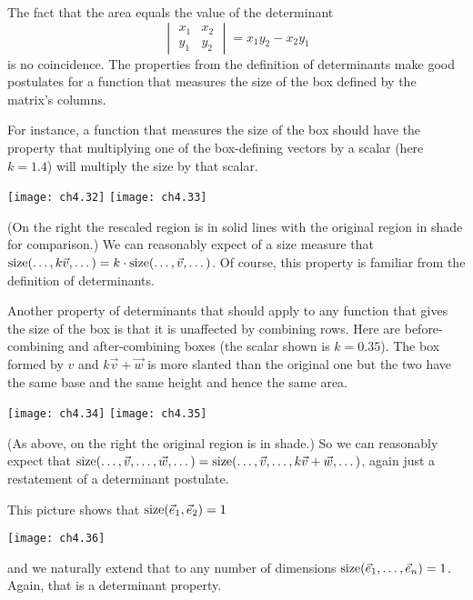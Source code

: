 The fact that the area equals the value of the determinant
\begin{equation*}
  \begin{vmatrix}
    x_1  &x_2  \\
    y_1  &y_2
  \end{vmatrix}
  =x_1y_2-x_2y_1
\end{equation*}
is no coincidence.
The properties from the definition of determinants 
make good postulates for a function 
that measures the size of the box
defined by the matrix's columns.

For instance, a function that measures the size of the box
should have the property that multiplying one of the box-defining vectors by
a scalar (here $k=1.4$)
will multiply the size by that scalar.
\begin{center}
  \texttt{[image: ch4.32]}
  \qquad
  \texttt{[image: ch4.33]}
\end{center}
(On the right the rescaled region is in solid lines with the 
original region in shade for comparison.)
We can reasonably expect of a size measure that
$\operatorname{size} (\dots,k\vec{v},\dots)=k\cdot\operatorname{size} (\dots,\vec{v},\dots)$.
Of course, this property is familiar from 
the definition of determinants.

Another property of determinants that should apply to any 
function that gives the size of the box is that
it is unaffected by combining rows.
Here are before-combining and 
after-combining boxes (the scalar shown is $k=0.35$). 
The box formed by $v$ and 
$k\vec{v}+\vec{w}$ is
more slanted than the original one but the two have the
same base and the same height and hence the same area.
\begin{center}
  \texttt{[image: ch4.34]}
  \qquad
  \texttt{[image: ch4.35]}
\end{center}   
(As above, on the right the 
original region is in shade.)
So we can reasonably expect that  
$\operatorname{size} (\dots,\vec{v},\dots,\vec{w},\dots)
=\operatorname{size} (\dots,\vec{v},\dots,k\vec{v}+\vec{w},\dots)$,
again just a restatement of a determinant postulate.

This picture shows that \( \operatorname{size} (\vec{e}_1,\vec{e}_2)=1 \)
\begin{center}
  \texttt{[image: ch4.36]}
\end{center}
and we naturally extend that to any number of dimensions
$\operatorname{size}(\vec{e}_1,\dots,\vec{e}_n)=1$.
Again, that is a determinant property.

